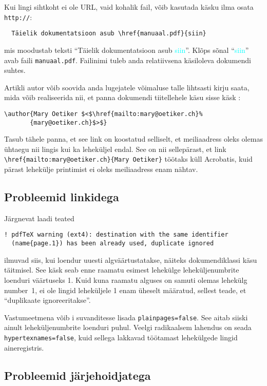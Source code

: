 Kui lingi sihtkoht ei ole URL, vaid kohalik fail, võib kasutada käsku
 ilma osata \texttt{http://}:
\begin{verbatim}
  Täielik dokumentatsioon asub \href{manuaal.pdf}{siin}
\end{verbatim}
mis moodustab teksti "`Täielik dokumentatsioon asub
\textcolor{cyan}{siin}"'. Klõps sõnal "`\textcolor{cyan}{siin}"' avab
faili \texttt{manuaal.pdf}. Failinimi tuleb anda relatiivsena
käsiloleva dokumendi suhtes.

Artikli autor võib soovida anda lugejatele võimaluse talle lihtsasti
kirju saata, mida võib realiseerida nii, et panna dokumendi tiitellehele
käsu  sisse käsk :
\begin{code}
\begin{verbatim}
\author{Mary Oetiker $<$\href{mailto:mary@oetiker.ch}%
       {mary@oetiker.ch}$>$}
\end{verbatim}
\end{code}
Tasub tähele panna, et see link on koostatud selliselt, et meiliaadress
oleks olemas ühtaegu nii lingis kui ka leheküljel endal. See on nii
sellepärast, et link \verb+\href{mailto:mary@oetiker.ch}{Mary Oetiker}+
töötaks küll Acrobatis, kuid pärast lehekülje
printimist ei oleks meiliaadress enam nähtav.

\subsection{Probleemid linkidega}

Järgnevat laadi teated
\begin{verbatim}
! pdfTeX warning (ext4): destination with the same identifier
  (name{page.1}) has been already used, duplicate ignored
\end{verbatim}
ilmuvad siis, kui loendur uuesti algväärtustatakse, näiteks
dokumendiklassi  käsu  täitmisel. See käsk
seab enne raamatu esimest lehekülge leheküljenumbrite loenduri
väärtuseks 1. Kuid kuna raamatu alguses on samuti olemas lehekülg
number~1, ei ole lingid leheküljele 1 enam üheselt määratud, sellest
teade, et "`duplikaate ignoreeritakse"'.

Vastumeetmena võib i suvanditesse lisada
\texttt{plainpages=false}. See aitab siiski ainult leheküljenumbrite
loenduri puhul. Veelgi radikaalsem lahendus on seada
\texttt{hypertexnames=false}, kuid sellega lakkavad töötamast
lehekülgede lingid aineregistris.

\subsection{Probleemid järjehoidjatega}


